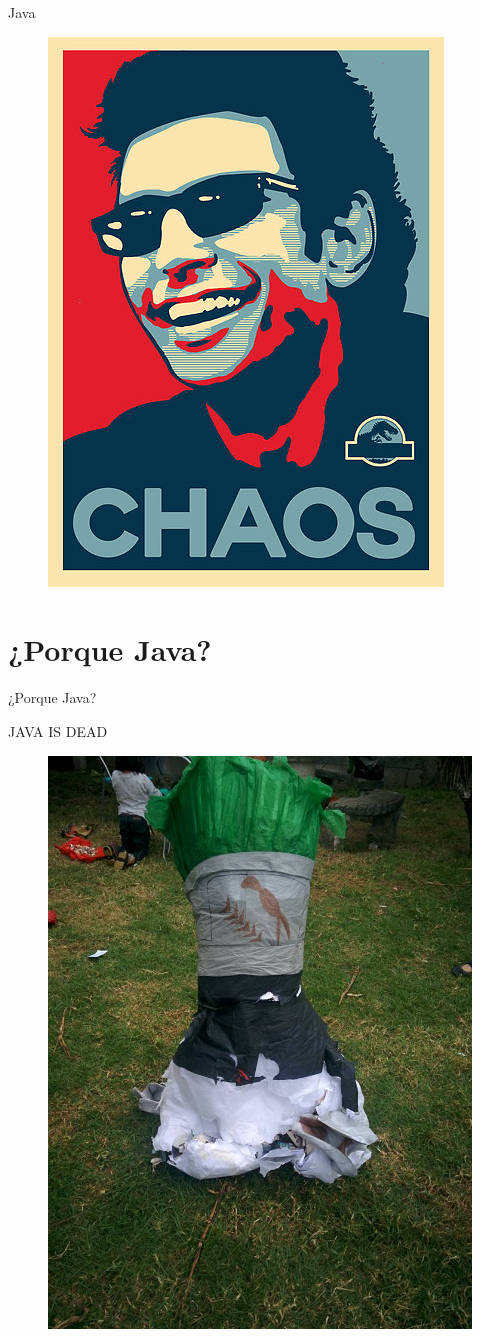 \documentclass{beamer}
\begin{document}
\begin{frame}{Java}
	\begin{figure}
		\centering
		\includegraphics[width=0.5\linewidth]{Images/chaos}
	\end{figure}
\end{frame}


\section{¿Porque Java?}
\begin{frame}
	\huge ¿Porque Java?
\end{frame}

\begin{frame}
	JAVA IS DEAD
\begin{figure}
	\centering
	\includegraphics[width=0.5\linewidth]{Images/dukedead.jpg}
\end{figure}
\end{frame}
\end{document}
